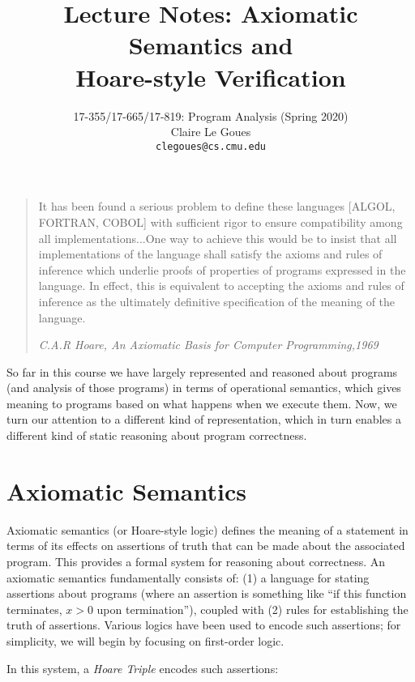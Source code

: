 \documentclass[11pt]{article}
\title{Lecture Notes: Axiomatic Semantics and \\ Hoare-style Verification}
\author{17-355/17-665/17-819: Program Analysis (Spring 2020)\\
        Claire Le Goues \\
		{\tt clegoues@cs.cmu.edu}}
\date{}
\begin{document}
\maketitle

\iffalse
\textbf{TODO: do Hoare logic in this order, then SMT, then get into symbolic
  execution, etc.  Doing SMT after those things but before synthesis (as Claire
  did in 2020) is definitely sub-optimal!}
\fi

\begin{quote}
  It has been found a serious problem to define these languages [ALGOL, FORTRAN,
  COBOL] with sufficient rigor to ensure compatibility among all
  implementations...One way to achieve this would be to insist that all
  implementations of the language shall satisfy the axioms and rules of
  inference which underlie proofs of properties of programs expressed in the
  language. In effect, this is equivalent to accepting the axioms and rules of
  inference as the ultimately definitive specification of the meaning of the
  language.

\emph{C.A.R Hoare, An Axiomatic Basis for Computer Programming,1969}
\end{quote}


So far in this course we have largely represented and reasoned about programs
(and analysis of those programs) in terms of operational semantics, which gives
meaning to programs based on what happens when we execute them.  Now, we turn
our attention to a different kind of representation, which in turn enables a
different kind of static reasoning about program correctness. 

\section{Axiomatic Semantics}

Axiomatic semantics (or Hoare-style logic) defines the meaning of a
statement in terms of its effects on assertions of truth that can be made about
the associated program. This provides a formal system for reasoning about correctness.
An axiomatic semantics fundamentally consists of: (1) a language for stating
assertions about programs (where an assertion is something like ``if this
function terminates, $x > 0$ upon termination''), coupled with (2) rules for
establishing the truth of assertions.  Various logics have been used to encode
such assertions; for simplicity, we will begin by focusing on first-order logic.

In this system, a \emph{Hoare Triple} encodes such assertions:
\end{document}
